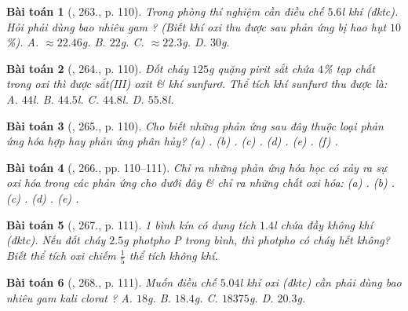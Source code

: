 \documentclass{article}
\newtheorem{baitoan}{Bài toán}
\begin{document}
\begin{baitoan}[\cite{An_400_BT_Hoa_Hoc_8_2020}, 263., p. 110]
	Trong phòng thí nghiệm cần điều chế $5.6$\emph{l} khí \emph{} (đktc). Hỏi phải dùng bao nhiêu gam \emph{}? (Biết khí oxi thu được sau phản ứng bị hao hụt $10$\%). {\sf A.} $\approx22.46$\emph{g}. {\sf B.} $22$\emph{g}. {\sf C.} $\approx22.3$\emph{g}. {\sf D.} $30$\emph{g}.
\end{baitoan}

\begin{baitoan}[\cite{An_400_BT_Hoa_Hoc_8_2020}, 264., p. 110]
	Đốt cháy $125$\emph{g} quặng pirit sắt chứa $4$\% tạp chất trong oxi thì được sắt(III) oxit \& khí sunfurơ. Thể tích khí sunfurơ thu được là: {\sf A.} $44$\emph{l}. {\sf B.} $44.5$\emph{l}. {\sf C.} $44.8$\emph{l}. {\sf D.} $55.8$\emph{l}.
\end{baitoan}

\begin{baitoan}[\cite{An_400_BT_Hoa_Hoc_8_2020}, 265., p. 110]
	Cho biết những phản ứng sau đây thuộc loại phản ứng hóa hợp hay phản ứng phân hủy? (a) \emph{}. (b) \emph{}. (c) \emph{}. (d) \emph{}. (e) \emph{}. (f) \emph{}.
\end{baitoan}

\begin{baitoan}[\cite{An_400_BT_Hoa_Hoc_8_2020}, 266., pp. 110--111]
	Chỉ ra những phản ứng hóa học có xảy ra sự oxi hóa trong các phản ứng cho dưới đây \& chỉ ra những chất oxi hóa: (a) \emph{}. (b) \emph{}. (c) \emph{}. (d) \emph{}. (e) \emph{}.
\end{baitoan}

\begin{baitoan}[\cite{An_400_BT_Hoa_Hoc_8_2020}, 267., p. 111]
	1 bình kín có dung tích $1.4$\emph{l} chứa đầy không khí (đktc). Nếu đốt cháy $2.5$\emph{g} photpho \emph{P} trong bình, thì photpho có cháy hết không? Biết thể tích oxi chiếm $\frac{1}{5}$ thể tích không khí.
\end{baitoan}

\begin{baitoan}[\cite{An_400_BT_Hoa_Hoc_8_2020}, 268., p. 111]
	Muốn điều chế $5.04$\emph{l} khí oxi (đktc) cần phải dùng bao nhiêu gam kali clorat \emph{}? {\sf A.} $18$\emph{g}. {\sf B.} $18.4$\emph{g}. {\sf C.} $18375$\emph{g}. {\sf D.} $20.3$\emph{g}.
\end{baitoan}
\end{document}
